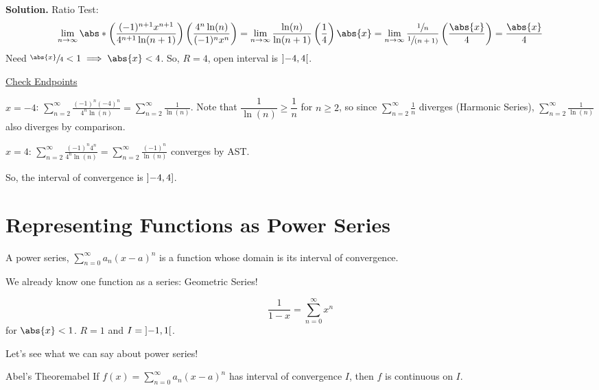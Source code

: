\begin{Example}{}{}
\begin{enumerate}[label=(\roman*)]
              \textbf{Solution.} Ratio Test:
              \[ \lim\limits_{{n} \to {\infty}}
                  \abs*{\left( \frac{(-1)^{n+1}x^{n+1}}{4^{n+1}\ln(n+1)} \right)
                  \left( \frac{4^n\ln(n)}{(-1)^n x^n}  \right)}
                  =\lim\limits_{{n} \to {\infty}} \frac{\ln(n)}{\ln(n+1)} \left( \frac{1}{4} \right)
                  \abs{x}
                  =\lim\limits_{{n} \to {\infty}} \frac{\sfrac{1}{n}}{\sfrac{1}{(n+1)}}
                  \left( \frac{\abs{x}}{4} \right)
                  =\frac{\abs{x}}{4} \]
              Need $ \sfrac{\abs{x}}{4}<1\implies \abs{x}<4  $. So, $ R=4 $,
              open interval is $ \interval[open]{-4}{4} $.

              \underline{Check Endpoints}

              $ x=-4 $: $ \displaystyle \sum\limits_{n=2}^{\infty} \frac{(-1)^n(-4)^n}{4^n\ln(n)}
                  =\sum\limits_{n=2}^{\infty} \frac{1}{\ln(n)} $. Note that $ \dfrac{1}{\ln(n)}
                  \geqslant \dfrac{1}{n} $ for $ n\geqslant 2 $, so
              since $ \displaystyle \sum\limits_{n=2}^{\infty} \frac{1}{n} $ diverges (Harmonic Series),
              $ \displaystyle \sum\limits_{n=2}^{\infty} \frac{1}{\ln(n)} $ also diverges by comparison.

              $ x=4 $: $ \displaystyle
                  \sum\limits_{n=2}^{\infty} \frac{(-1)^n4^n}{4^n\ln(n)}=\sum\limits_{n=2}^{\infty}
                  \frac{(-1)^n}{\ln(n)}  $ converges by AST\@.

              So, the interval of convergence is $ \interval[open left]{-4}{4} $.
    \end{enumerate}
\end{Example}

\section{Representing Functions as Power Series}
A power series, $ \sum\limits_{n=0}^{\infty} a_n(x-a)^n $ is a function whose domain is its
interval of convergence.

We already know one function as a series: Geometric Series!

\[ \boxed{\frac{1}{1-x}=\sum\limits_{n=0}^{\infty} x^n} \]
for $ \abs{x}<1 $. $ R=1 $ and $ I=\interval[open]{-1}{1} $.

Let's see what we can say about power series!

\begin{Theorem}{Abel's Theorem}{abel}
    If $ f(x)=\sum\limits_{n=0}^{\infty} a_n(x-a)^n $ has interval of convergence
    $ I $, then $ f $ is continuous on $ I $.
\end{Theorem}

